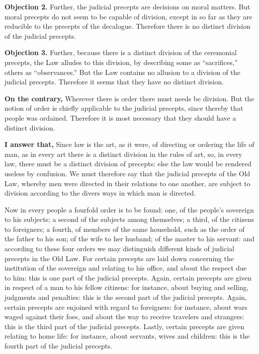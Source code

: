 \textbf{Objection 2.} Further, the judicial precepts are decisions on moral matters. But moral precepts do not seem to be capable of division, except in so far as they are reducible to the precepts of the decalogue. Therefore there is no distinct division of the judicial precepts.

\textbf{Objection 3.} Further, because there is a distinct division of the ceremonial precepts, the Law alludes to this division, by describing some as ``sacrifices,'' others as ``observances.'' But the Law contains no allusion to a division of the judicial precepts. Therefore it seems that they have no distinct division.

\textbf{On the contrary,} Wherever there is order there must needs be division. But the notion of order is chiefly applicable to the judicial precepts, since thereby that people was ordained. Therefore it is most necessary that they should have a distinct division.

\textbf{I answer that,} Since law is the art, as it were, of directing or ordering the life of man, as in every art there is a distinct division in the rules of art, so, in every law, there must be a distinct division of precepts: else the law would be rendered useless by confusion. We must therefore say that the judicial precepts of the Old Law, whereby men were directed in their relations to one another, are subject to division according to the divers ways in which man is directed.

Now in every people a fourfold order is to be found: one, of the people's sovereign to his subjects; a second of the subjects among themselves; a third, of the citizens to foreigners; a fourth, of members of the same household, such as the order of the father to his son; of the wife to her husband; of the master to his servant: and according to these four orders we may distinguish different kinds of judicial precepts in the Old Law. For certain precepts are laid down concerning the institution of the sovereign and relating to his office, and about the respect due to him: this is one part of the judicial precepts. Again, certain precepts are given in respect of a man to his fellow citizens: for instance, about buying and selling, judgments and penalties: this is the second part of the judicial precepts. Again, certain precepts are enjoined with regard to foreigners: for instance, about wars waged against their foes, and about the way to receive travelers and strangers: this is the third part of the judicial precepts. Lastly, certain precepts are given relating to home life: for instance, about servants, wives and children: this is the fourth part of the judicial precepts.

